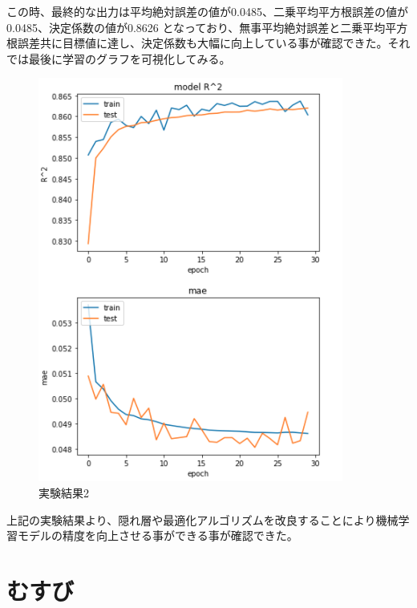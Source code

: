 \documentclass{report}
\begin{document}
この時、最終的な出力は平均絶対誤差の値が0.0485、二乗平均平方根誤差の値が0.0485、決定係数の値が0.8626 となっており、無事平均絶対誤差と二乗平均平方根誤差共に目標値に達し、決定係数も大幅に向上している事が確認できた。それでは最後に学習のグラフを可視化してみる。
\\


\begin{figure}[H]
\begin{center}
\includegraphics[width=\linewidth]{experiment2.png}
\caption{実験結果2}
\end{center}
\end{figure}


上記の実験結果より、隠れ層や最適化アルゴリズムを改良することにより機械学習モデルの精度を向上させる事ができる事が確認できた。

\newpage
\section{むすび}
\end{document}
